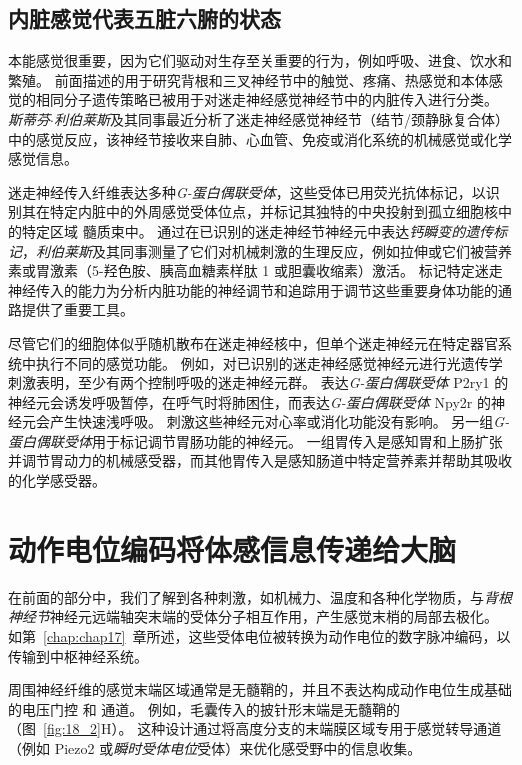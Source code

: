 \subsection{内脏感觉代表五脏六腑的状态}

本能感觉很重要，因为它们驱动对生存至关重要的行为，例如呼吸、进食、饮水和繁殖。
前面描述的用于研究背根和三叉神经节中的触觉、疼痛、热感觉和本体感觉的相同分子遗传策略已被用于对迷走神经感觉神经节中的内脏传入进行分类。
\textit{斯蒂芬$\cdot$利伯莱斯}及其同事最近分析了迷走神经感觉神经节（结节/颈静脉复合体）中的感觉反应，该神经节接收来自肺、心血管、免疫或消化系统的机械感觉或化学感觉信息。


迷走神经传入纤维表达多种\textit{G-蛋白偶联受体}，这些受体已用荧光抗体标记，以识别其在特定内脏中的外周感觉受体位点，并标记其独特的中央投射到孤立细胞核中的特定区域 髓质束中。
通过在已识别的迷走神经节神经元中表达\textit{钙瞬变的遗传标记}，\textit{利伯莱斯}及其同事测量了它们对机械刺激的生理反应，例如拉伸或它们被营养素或胃激素（5-羟色胺、胰高血糖素样肽 1 或胆囊收缩素）激活。
标记特定迷走神经传入的能力为分析内脏功能的神经调节和追踪用于调节这些重要身体功能的通路提供了重要工具。


尽管它们的细胞体似乎随机散布在迷走神经核中，但单个迷走神经元在特定器官系统中执行不同的感觉功能。
例如，对已识别的迷走神经感觉神经元进行光遗传学刺激表明，至少有两个控制呼吸的迷走神经元群。
表达\textit{G-蛋白偶联受体} P2ry1 的神经元会诱发呼吸暂停，在呼气时将肺困住，而表达\textit{G-蛋白偶联受体} Npy2r 的神经元会产生快速浅呼吸。
刺激这些神经元对心率或消化功能没有影响。
另一组\textit{G-蛋白偶联受体}用于标记调节胃肠功能的神经元。
一组胃传入是感知胃和上肠扩张并调节胃动力的机械感受器，而其他胃传入是感知肠道中特定营养素并帮助其吸收的化学感受器。



\section{动作电位编码将体感信息传递给大脑}

在前面的部分中，我们了解到各种刺激，如机械力、温度和各种化学物质，与\textit{背根神经节}神经元远端轴突末端的受体分子相互作用，产生感觉末梢的局部去极化。
如第~\ref{chap:chap17}~章所述，这些受体电位被转换为动作电位的数字脉冲编码，以传输到中枢神经系统。


周围神经纤维的感觉末端区域通常是无髓鞘的，并且不表达构成动作电位生成基础的电压门控  和  通道。
例如，毛囊传入的披针形末端是无髓鞘的（图~\ref{fig:18_2}H）。
这种设计通过将高度分支的末端膜区域专用于感觉转导通道（例如 Piezo2 或\textit{瞬时受体电位}受体）来优化感受野中的信息收集。


